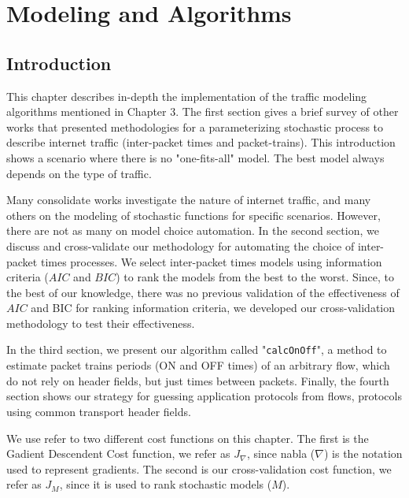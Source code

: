 \chapter{Modeling and Algorithms}\label{ch:modeling-evaluation}


\section{Introduction}


This chapter describes in-depth the implementation of the traffic modeling algorithms mentioned in Chapter 3. The first section gives a brief survey of other works that presented methodologies for a parameterizing stochastic process to describe internet traffic (inter-packet times and packet-trains). This introduction shows a scenario where there is no "one-fits-all" model. The best model always depends on the type of traffic. 

Many consolidate works investigate the nature of internet traffic, and many others on the modeling of stochastic functions for specific scenarios. However, there are not as many on model choice automation. In the second section, we discuss and cross-validate our methodology for automating the choice of inter-packet times processes. We select inter-packet times models using information criteria ($AIC$ and $BIC$) to rank the models from the best to the worst.  Since, to the best of our knowledge, there was no previous validation of the effectiveness of $AIC$ and BIC for ranking information criteria, we developed our cross-validation methodology to test their effectiveness.  

In the third section, we present our algorithm called "\texttt{calcOnOff}", a method to estimate packet trains periods (ON and OFF times) of an arbitrary flow, which do not rely on header fields, but just times between packets. Finally, the fourth section shows our strategy for guessing application protocols from flows, protocols using common transport header fields.


We use refer to two different cost functions on this chapter. The first is the Gadient Descendent Cost function, we refer as $J_\nabla$, since nabla ($\nabla$) is the notation used to represent gradients. The second is our cross-validation cost function, we refer as $J_M$, since it is used to rank stochastic models ($M$).



